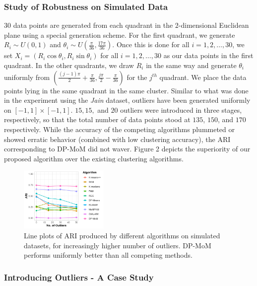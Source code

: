 \documentclass{article}
\begin{document}
\subsubsection{Study of Robustness on Simulated Data} $30$ data points are generated from each quadrant in the $2$-dimensional Euclidean plane using a special generation scheme. For the first quadrant, we generate $R_i \sim U(0, 1)$ and $\theta_i \sim U\left(\frac{\pi}{36}, \frac{17\pi}{36}\right)$. Once this is done for all $i=1,2,\ldots,30$, we set $X_i = (R_i\cos\theta_i, R_i\sin \theta_i)$ for all $i=1,2,\ldots,30$ as our data points in the first quadrant. In the other quadrants, we draw $R_i$ in the same way and generate $\theta_i$ uniformly from $\left(\frac{(j - 1)\pi}{2} + \frac{\pi}{36}, \frac{j\pi}{2} - \frac{\pi}{36}\right)$ for the $j^{th}$ quadrant. We place the data points lying in the same quadrant in the same cluster. Similar to what was done in the experiment using the \textit{Jain} dataset, outliers have been generated uniformly on $[-1, 1] \times [-1, 1]$. $15, 15,$ and $20$ outliers were introduced in three stages, respectively, so that the total number of data points stood at $135$, $150$, and $170$ respectively. While the accuracy of the competing algorithms plummeted or showed erratic behavior (combined with low clustering accuracy), the ARI corresponding to DP-MoM did not waver. Figure 2 depicts the superiority of our proposed algorithm over the existing clustering algorithms.

\begin{figure}[!htb]
    \centering
    \includegraphics[width=0.38\textwidth]{Diagrams/plot-ari-sim-light-0.6.png}
    \caption{Line plots of ARI produced by different algorithms on simulated datasets, for increasingly higher number of outliers. DP-MoM performs uniformly better than all competing methods.}
    \label{fig:plot-sim-ari}
\end{figure}

\subsubsection{Introducing Outliers - A Case Study}
\end{document}
